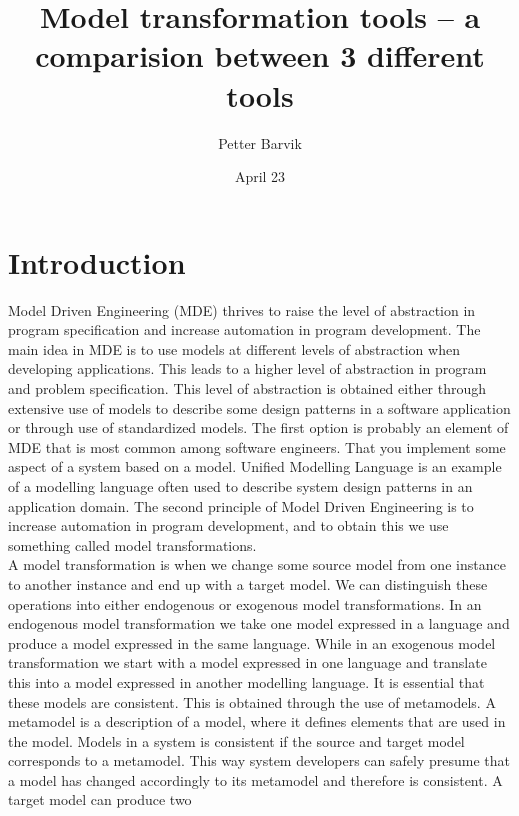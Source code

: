 \documentclass[pdftex,11pt,a4paper]{article}
\begin{document}
\title{Model transformation tools -- a comparision between 3 different tools}
\date{April 23}
\author{Petter Barvik}

\maketitle

\abstract{}

\newpage
\section{Introduction}

\noindent Model Driven Engineering (MDE)\cite{France2007} thrives to raise the
level of abstraction in program specification and increase automation in program
development. The main idea in MDE is to use models at different levels of
abstraction when developing applications. This leads to a higher level
of abstraction in program and problem specification. This level of abstraction
is obtained either through extensive use of models to describe some design
patterns in a software application or through use of standardized models. The
first option is probably an element of MDE that is most common among software
engineers. That you implement some aspect of a system based on a model. Unified
Modelling Language is an example of a modelling language often used to describe
system design patterns in an application domain. The second principle of Model
Driven Engineering is to increase automation in program development, and to
obtain this we use something called model transformations. \\
\indent A model transformation is when we change some source model from one
instance to another instance and end up with a target model. We can
distinguish these operations into either endogenous or exogenous model
transformations. In an endogenous model transformation we take one model
expressed in a language and produce a model expressed in the same language.
While in an exogenous model transformation we start with a model
expressed in one language and translate this into a model expressed in another
modelling language. It is essential that these models are consistent. This is
obtained through the use of metamodels. A metamodel is a description of a
model, where it defines elements that are used in the model. Models in a system
is consistent if the source and target model corresponds to a metamodel. This
way system developers can safely presume that a model has changed accordingly
to its metamodel and therefore is consistent. A target model can produce two
\end{document}
